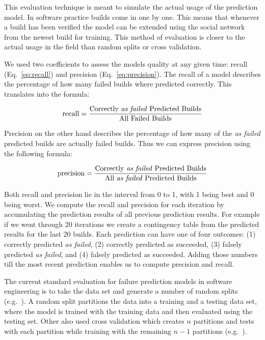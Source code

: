 \documentclass[12pt,oneside]{book}
\begin{document}
This evaluation technique is meant to simulate the actual usage of the prediction model.
In software practice builds come in one by one.
This means that whenever a build has been verified the model can be extended using the social network from the newest build for training. 
This method of evaluation is closer to the actual usage in the field than
random splits or cross validation.

We used two coefficients to assess the models quality at any given time: recall (Eq.~\ref{eq:recall}) and precision (Eq.~\ref{eq:precision}).
The recall of a model describes the percentage of how many failed builds where predicted correctly.
This translates into the formula:

\begin{equation}
\label{eq:recall}
\text{recall}=\frac{\text{Correctly \emph{as failed} Predicted Builds}}{\text{All Failed Builds}}
\end{equation}

Precision on the other hand describes the percentage of how many of the \emph{as failed} predicted builds are actually failed builds. Thus we can express precision using the following formula:

\begin{equation}
\label{eq:precision}
\text{precision}=\frac{\text{Correctly \emph{as failed} Predicted Builds}}{\text{All \emph{as failed} Predicted Builds}}
\end{equation}

Both recall and precision lie in the interval from 0 to 1, with 1 being best and 0 being worst.
We compute the recall and precision for each iteration by accumulating the prediction results of all previous prediction results.
For example if we went through 20 iterations we create a contingency table from the predicted results for the last 20 builds.
Each prediction can have one of four outcomes: (1) correctly predicted \emph{as failed}, (2) correctly predicted as succeeded, (3) falsely predicted \emph{as failed}, and (4) falsely predicted as succeeded.
Adding those numbers till the most recent prediction enables us to compute precision and recall.


The current standard evaluation for failure prediction models in software engineering is to take the data set and generate a number of random splits (e.g.~\cite{zimmermann:icse:2008,schroeter:isese:2006,nagappan:icse:2008}).
A random split partitions the data into a training and a testing data set, where the model is trained with the training data and then evaluated using the testing set.
Other also used cross validation which creates $n$ partitions and tests with each partition while training with the remaining $n-1$ partitions (e.g.~\cite{wolf:icse:2009}).
\end{document}

